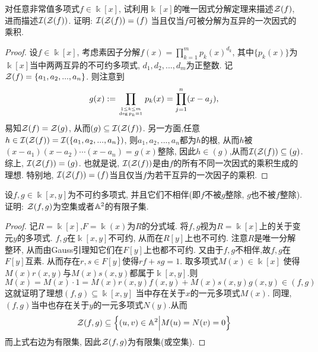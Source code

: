 \documentclass[oneside,a4papar,11pt,UTF8]{book}
\begin{document}
\begin{enumerate}
  \begin{prob}\label{ex-15-1-19}
    对任意非常值多项式$f\in\Bbbk[x]$,
    试利用$\Bbbk[x]$的唯一因式分解定理来描述$\mathcal{Z}(f)$,
    进而描述$\mathcal{I}(\mathcal{Z}(f))$.
    证明: $\mathcal{I}(\mathcal{Z}(f))=(f)$
    当且仅当$f$可被分解为互异的一次因式的乘积.
  \end{prob}

  \begin{proof}
    设$f\in\Bbbk[x]$,
    考虑素因子分解$f(x)=\prod_{k=1}^{m}p_k(x)^{d_k}$,
    其中$\{p_k(x)\}$为$\Bbbk[x]$当中两两互异的不可约多项式,
    $d_1,d_2,...,d_m$为正整数.
    记$\mathcal{Z}(f)=\{a_1,a_2,...,a_n\}$.
    则注意到
    \[g(x):=\prod_{1\leq k\leq m\atop \deg p_k=1}p_k(x)
    =\prod_{j=1}^{n}(x-a_j),\]
    易知$\mathcal{Z}(f)=\mathcal{Z}(g)$,
    从而$(g)\subseteq\mathcal{I}(\mathcal{Z}(f))$.
    另一方面,任意$h\in\mathcal{I}(\mathcal{Z}(f))
    =\mathcal{I}(\{a_1,a_2,...,a_n\})$,
    则$a_1,a_2,...,a_n$都为$h$的根,
    从而$h$被$(x-a_1)(x-a_2)\cdots(x-a_n)=g(x)$整除,
    因此$h\in(g)$,从而$\mathcal{I}(\mathcal{Z}(f))\subseteq(g)$.
    综上, $\mathcal{I}(\mathcal{Z}(f))=(g)$.
    也就是说, $\mathcal{I}(\mathcal{Z}(f))$是由$f$的所有不同一次因式的乘积生成的理想.
    特别地, $\mathcal{I}(\mathcal{Z}(f))=(f)$当且仅当$f$为若干互异的一次因子的乘积.
  \end{proof}

  \begin{prob}\label{ex-15-1-20}
    设$f,g\in\Bbbk[x,y]$为不可约多项式,
    并且它们不相伴(即$f$不被$g$整除, $g$也不被$f$整除).
    证明: $\mathcal{Z}(f,g)$为空集或者$\mathbb{A}^2$的有限子集.
  \end{prob}

  \begin{proof}
    记$R=\Bbbk[x]$,$F=\Bbbk(x)$为$R$的分式域.
    将$f,g$视为$R=\Bbbk[x]$上的关于变元$y$的多项式.
    $f,g$在$\Bbbk[x,y]$不可约,
    从而在$R[y]$上也不可约.
    注意$R$是唯一分解整环,
    从而由Gauss引理知它们在$F[y]$上也都不可约.
    又由于$f,g$不相伴,故$f,g$在$F[y]$互素.
    从而存在$r,s\in F[y]$使得$rf+sg=1$.
    取多项式$M(x)\in\Bbbk[x]$
    使得$M(x)r(x,y)$与$M(x)s(x,y)$都属于$\Bbbk[x,y]$.则
    \[M(x)=M(x)\cdot 1=M(x)r(x,y)f(x,y)+M(x)s(x,y)g(x,y)\in(f,g)\]
    这就证明了理想$(f,g)\subseteq\Bbbk[x,y]$
    当中存在关于$x$的一元多项式$M(x)$.
    同理,$(f,g)$当中也存在关于$y$的一元多项式$N(y)$.从而
    \[\mathcal{Z}(f,g)\subseteq
    \Big\{ (u,v)\in\mathbb{A}^2 \Big| M(u)=N(v)=0 \Big\}\]
    而上式右边为有限集,
    因此$\mathcal{Z}(f,g)$为有限集(或空集).
  \end{proof}


\end{enumerate}
\end{document}
